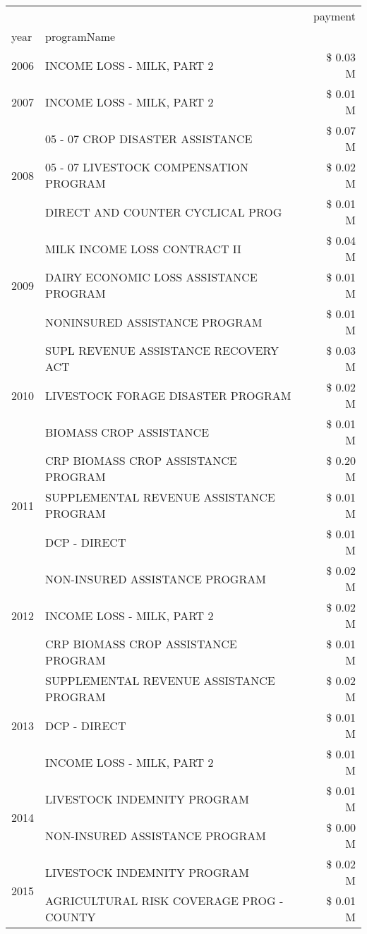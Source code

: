 \begin{tabular}{llr}
\toprule
 &  & payment \\
year & programName &  \\
\midrule
2006 & INCOME LOSS - MILK, PART 2 & \$ 0.03 M \\
\cline{1-3}
2007 & INCOME LOSS - MILK, PART 2 & \$ 0.01 M \\
\cline{1-3}
\multirow[t]{3}{*}{2008} & 05 - 07 CROP DISASTER ASSISTANCE & \$ 0.07 M \\
 & 05 - 07 LIVESTOCK COMPENSATION PROGRAM & \$ 0.02 M \\
 & DIRECT AND COUNTER CYCLICAL PROG & \$ 0.01 M \\
\cline{1-3}
\multirow[t]{3}{*}{2009} & MILK INCOME LOSS CONTRACT II & \$ 0.04 M \\
 & DAIRY ECONOMIC LOSS ASSISTANCE PROGRAM & \$ 0.01 M \\
 & NONINSURED ASSISTANCE PROGRAM & \$ 0.01 M \\
\cline{1-3}
\multirow[t]{3}{*}{2010} & SUPL REVENUE ASSISTANCE RECOVERY ACT & \$ 0.03 M \\
 & LIVESTOCK FORAGE DISASTER  PROGRAM & \$ 0.02 M \\
 & BIOMASS CROP ASSISTANCE & \$ 0.01 M \\
\cline{1-3}
\multirow[t]{3}{*}{2011} & CRP BIOMASS CROP ASSISTANCE PROGRAM & \$ 0.20 M \\
 & SUPPLEMENTAL REVENUE ASSISTANCE PROGRAM & \$ 0.01 M \\
 & DCP - DIRECT & \$ 0.01 M \\
\cline{1-3}
\multirow[t]{3}{*}{2012} & NON-INSURED ASSISTANCE PROGRAM & \$ 0.02 M \\
 & INCOME LOSS - MILK, PART 2 & \$ 0.02 M \\
 & CRP BIOMASS CROP ASSISTANCE PROGRAM & \$ 0.01 M \\
\cline{1-3}
\multirow[t]{3}{*}{2013} & SUPPLEMENTAL REVENUE ASSISTANCE PROGRAM & \$ 0.02 M \\
 & DCP - DIRECT & \$ 0.01 M \\
 & INCOME LOSS - MILK, PART 2 & \$ 0.01 M \\
\cline{1-3}
\multirow[t]{2}{*}{2014} & LIVESTOCK INDEMNITY PROGRAM & \$ 0.01 M \\
 & NON-INSURED ASSISTANCE PROGRAM & \$ 0.00 M \\
\cline{1-3}
\multirow[t]{3}{*}{2015} & LIVESTOCK INDEMNITY PROGRAM & \$ 0.02 M \\
 & AGRICULTURAL RISK COVERAGE PROG - COUNTY & \$ 0.01 M \\

\end{tabular}
